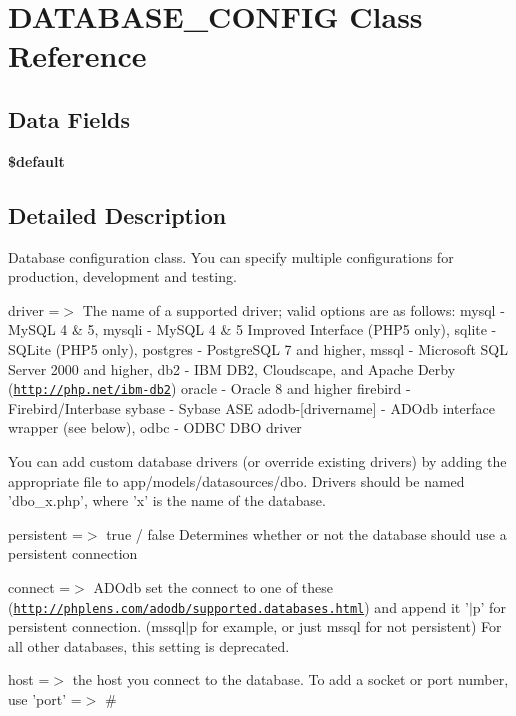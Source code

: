 \hypertarget{class_d_a_t_a_b_a_s_e___c_o_n_f_i_g}{
\section{DATABASE\_\-CONFIG Class Reference}
\label{class_d_a_t_a_b_a_s_e___c_o_n_f_i_g}
}
\subsection*{Data Fields}
\begin{DoxyCompactItemize}
\item 
{\bfseries \$default}
\end{DoxyCompactItemize}


\subsection{Detailed Description}
Database configuration class. You can specify multiple configurations for production, development and testing.

driver =$>$ The name of a supported driver; valid options are as follows: mysql -\/ MySQL 4 \& 5, mysqli -\/ MySQL 4 \& 5 Improved Interface (PHP5 only), sqlite -\/ SQLite (PHP5 only), postgres -\/ PostgreSQL 7 and higher, mssql -\/ Microsoft SQL Server 2000 and higher, db2 -\/ IBM DB2, Cloudscape, and Apache Derby (\href{http://php.net/ibm-db2}{\tt http://php.net/ibm-\/db2}) oracle -\/ Oracle 8 and higher firebird -\/ Firebird/Interbase sybase -\/ Sybase ASE adodb-\/\mbox{[}drivername\mbox{]} -\/ ADOdb interface wrapper (see below), odbc -\/ ODBC DBO driver

You can add custom database drivers (or override existing drivers) by adding the appropriate file to app/models/datasources/dbo. Drivers should be named 'dbo\_\-x.php', where 'x' is the name of the database.

persistent =$>$ true / false Determines whether or not the database should use a persistent connection

connect =$>$ ADOdb set the connect to one of these (\href{http://phplens.com/adodb/supported.databases.html}{\tt http://phplens.com/adodb/supported.databases.html}) and append it '$|$p' for persistent connection. (mssql$|$p for example, or just mssql for not persistent) For all other databases, this setting is deprecated.

host =$>$ the host you connect to the database. To add a socket or port number, use 'port' =$>$ \#

